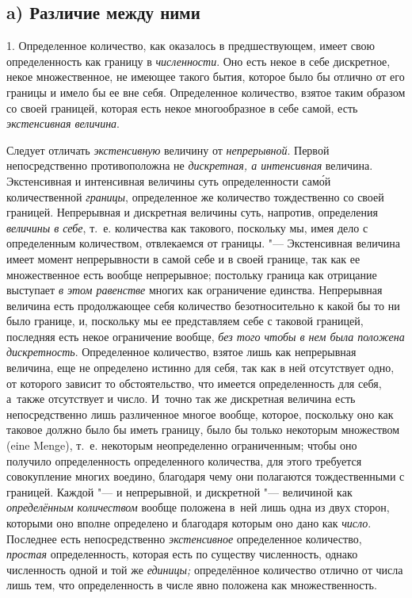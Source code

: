 
\subsection[a) Различие между ними]{a) Различие между ними}

1. Определенное количество, как оказалось в предшествующем, имеет свою
определенность как границу в {\em численности}. Оно есть некое в себе дискретное,
некое множественное, не имеющее такого бытия, которое было бы отлично от его
границы и имело бы ее вне себя. Определенное количество, взятое таким образом
со своей границей, которая есть некое многообразное в себе самой, есть
{\em экстенсивная величина}.

Следует отличать {\em экстенсивную} величину от {\em непрерывной}. Первой
непосредственно противоположна не {\em дискретная, а интенсивная}
величина. Экстенсивная и интенсивная величины суть определенности сам\'{о}й
количественной {\em границы}, определенное же количество тождественно со своей
границей. Непрерывная и дискретная величины суть, напротив, определения
{\em величины в себе}, т.~е. количества как такового, поскольку мы, имея дело
с определенным количеством, отвлекаемся от границы. "--- Экстенсивная величина
имеет момент непрерывности в самой себе и в своей границе, так как ее
множественное есть вообще непрерывное; постольку граница как отрицание
выступает {\em в этом равенстве} многих как ограничение единства. Непрерывная
величина есть продолжающее себя количество безотносительно к какой бы то ни
было границе, и, поскольку мы ее представляем себе с таковой границей,
последняя есть некое ограничение вообще, {\em без того чтобы в нем была
положена дискретность}. Определенное количество, взятое лишь как непрерывная
величина, еще не определено истинно для себя, так как в ней отсутствует одно,
от которого зависит то обстоятельство, что имеется определенность для себя,
а~также отсутствует и число. И~точно так же дискретная величина есть
непосредственно лишь различенное многое вообще, которое, поскольку оно как
таковое должно было бы иметь границу, было бы только некоторым множеством (eine
Men\-ge), т.~е. некоторым неопределенно ограниченным; чтобы оно получило
определенность определенного количества, для этого требуется совокупление
многих воедино, благодаря чему они полагаются тождественными с границей.
Каждой "--- и непрерывной, и дискретной "--- величиной как
{\em определённым количеством} вообще положена в~ней лишь одна из двух сторон,
которыми оно вполне определено и благодаря которым оно дано
как {\em число}. Последнее
есть непосредственно {\em экстенсивное} определенное количество, {\em простая}
определенность, которая есть по существу численность, однако численность одной
и той же {\em единицы;} определённое количество отлично от числа лишь тем, что определенность
в числе явно положена как множественность.

